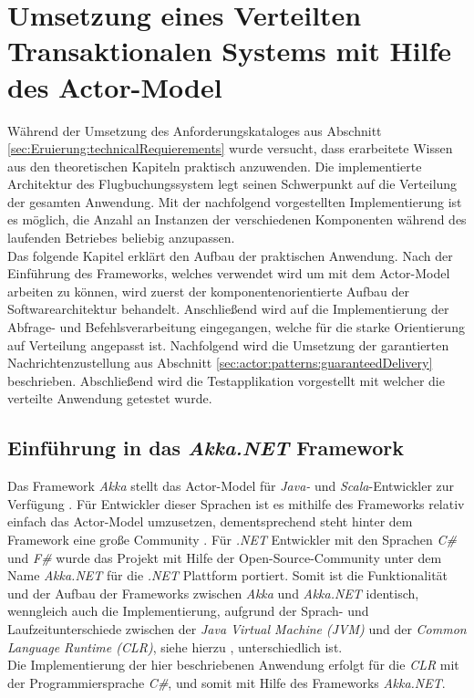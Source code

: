 \chapter{Umsetzung eines Verteilten Transaktionalen Systems mit Hilfe des Actor-Model} 
\label{cha:practicalDevelopment}

Während der Umsetzung des Anforderungskataloges aus Abschnitt \ref{sec:Eruierung:technicalRequierements} wurde versucht, dass erarbeitete Wissen aus den theoretischen Kapiteln praktisch anzuwenden. Die implementierte Architektur des Flugbuchungssystem legt seinen Schwerpunkt auf die Verteilung der gesamten Anwendung. Mit der nachfolgend vorgestellten Implementierung ist es möglich, die Anzahl an Instanzen der verschiedenen Komponenten während des laufenden Betriebes beliebig anzupassen. \\
Das folgende Kapitel erklärt den Aufbau der praktischen Anwendung. Nach der Einführung des Frameworks, welches verwendet wird um mit dem  Actor-Model arbeiten zu können, wird zuerst der komponentenorientierte Aufbau der Softwarearchitektur behandelt. Anschließend wird auf die Implementierung der Abfrage- und Befehlsverarbeitung eingegangen, welche für die starke Orientierung auf Verteilung angepasst ist. Nachfolgend wird die Umsetzung der garantierten Nachrichtenzustellung aus Abschnitt \ref{sec:actor:patterns:guaranteedDelivery} beschrieben. Abschließend wird die Testapplikation vorgestellt mit welcher die verteilte Anwendung getestet wurde.

\section{Einführung in das \textit{Akka.NET} Framework}
\label{sec:implementation:akka}
Das Framework \textit{Akka} stellt das Actor-Model für \textit{Java-} und \textit{Scala}-Entwickler zur Verfügung \citep{gupta2012akkaEssentiaol}. Für Entwickler dieser Sprachen ist es mithilfe des Frameworks relativ einfach das Actor-Model umzusetzen, dementsprechend steht hinter dem Framework eine große Community \citep{Vernon2015ReactiveAkka}. Für \textit{.NET} Entwickler mit den Sprachen \textit{C\#} und \textit{F\#} wurde das Projekt mit Hilfe der Open-Source-Community unter dem Name \textit{Akka.NET} für die \textit{.NET} Plattform portiert. Somit ist die Funktionalität und der Aufbau der Frameworks zwischen \textit{Akka} und \textit{Akka.NET} identisch, wenngleich auch die Implementierung, aufgrund der Sprach- und Laufzeitunterschiede zwischen der \textit{Java Virtual Machine (JVM)} und der \textit{Common Language Runtime (CLR)}, siehe hierzu \cite{JvmVsClrsinger2003jvm}, unterschiedlich ist. \\
Die Implementierung der hier beschriebenen Anwendung erfolgt für die \textit{CLR} mit der Programmiersprache \textit{C\#}, und somit mit Hilfe des Frameworks \textit{Akka.NET}. 

